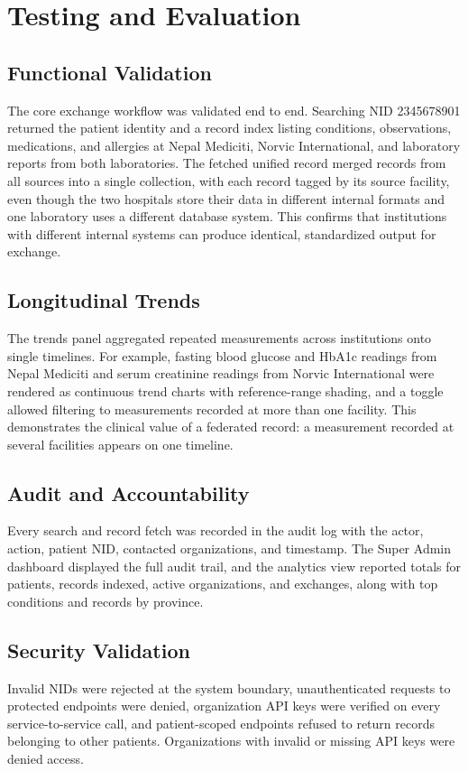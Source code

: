 \documentclass[12pt]{report}
\numberwithin{equation}{chapter}
\begin{document}
\section{Testing and Evaluation}
\subsection{Functional Validation}
The core exchange workflow was validated end to end. Searching NID 2345678901 returned the patient identity and a record index listing conditions, observations, medications, and allergies at Nepal Mediciti, Norvic International, and laboratory reports from both laboratories. The fetched unified record merged records from all sources into a single collection, with each record tagged by its source facility, even though the two hospitals store their data in different internal formats and one laboratory uses a different database system. This confirms that institutions with different internal systems can produce identical, standardized output for exchange.

\subsection{Longitudinal Trends}
The trends panel aggregated repeated measurements across institutions onto single timelines. For example, fasting blood glucose and HbA1c readings from Nepal Mediciti and serum creatinine readings from Norvic International were rendered as continuous trend charts with reference-range shading, and a toggle allowed filtering to measurements recorded at more than one facility. This demonstrates the clinical value of a federated record: a measurement recorded at several facilities appears on one timeline.

\subsection{Audit and Accountability}
Every search and record fetch was recorded in the audit log with the actor, action, patient NID, contacted organizations, and timestamp. The Super Admin dashboard displayed the full audit trail, and the analytics view reported totals for patients, records indexed, active organizations, and exchanges, along with top conditions and records by province.

\subsection{Security Validation}
Invalid NIDs were rejected at the system boundary, unauthenticated requests to protected endpoints were denied, organization API keys were verified on every service-to-service call, and patient-scoped endpoints refused to return records belonging to other patients. Organizations with invalid or missing API keys were denied access.
\end{document}
